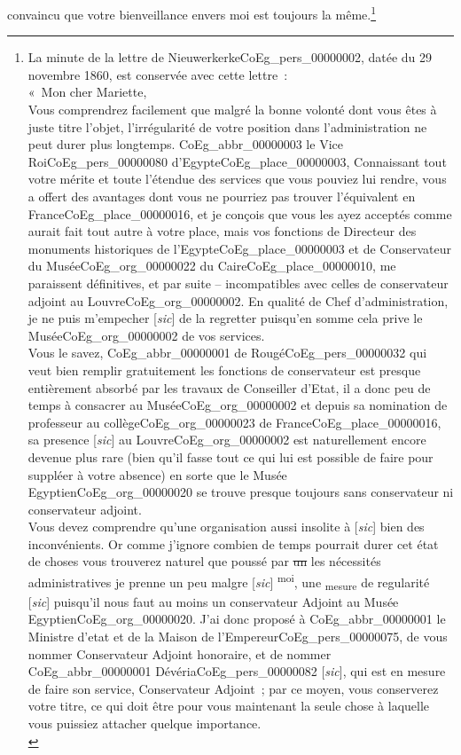 \documentclass{book}
\begin{document}
convaincu que votre bienveillance envers moi est toujours la même.\footnote{La minute de la lettre de Nieuwerkerke\gls{CoEg_pers_00000002}, datée du 29 novembre 1860, est conservée avec cette lettre~:\\
\indent «~Mon cher Mariette,\\
\indent Vous comprendrez facilement que malgré la bonne volonté dont vous êtes à juste titre l’objet, l’irrégularité de votre position dans l’administration ne peut durer plus longtemps. \gls{CoEg_abbr_00000003} le Vice Roi\gls{CoEg_pers_00000080} d’Egypte\gls{CoEg_place_00000003}, Connaissant tout votre mérite et toute l’étendue des services que vous pouviez lui rendre, vous a offert des avantages dont vous ne pourriez pas trouver l’équivalent en France\gls{CoEg_place_00000016}, et je conçois que vous les ayez acceptés comme aurait fait tout autre à votre place, mais vos fonctions de Directeur des monuments historiques de l’Egypte\gls{CoEg_place_00000003} et de Conservateur du Musée\gls{CoEg_org_00000022} du Caire\gls{CoEg_place_00000010}, me paraissent définitives, et par suite – incompatibles avec celles de conservateur adjoint au Louvre\gls{CoEg_org_00000002}. En qualité de Chef d’administration, je ne puis m’empecher [\textit{sic}] de la regretter puisqu’en somme cela prive le Musée\gls{CoEg_org_00000002} de vos services.\\
\indent Vous le savez, \gls{CoEg_abbr_00000001} de Rougé\gls{CoEg_pers_00000032} qui veut bien remplir gratuitement les fonctions de conservateur est presque entièrement absorbé par les travaux de Conseiller d’Etat, il a donc peu de temps à consacrer au Musée\gls{CoEg_org_00000002} et depuis sa nomination de professeur au collège\gls{CoEg_org_00000023} de France\gls{CoEg_place_00000016}, sa presence [\textit{sic}] au Louvre\gls{CoEg_org_00000002} est naturellement encore devenue plus rare (bien qu’il fasse tout ce qui lui est possible de faire pour suppléer à votre absence) en sorte que le Musée Egyptien\gls{CoEg_org_00000020} se trouve presque toujours sans conservateur ni conservateur adjoint.\\
\indent Vous devez comprendre qu’une organisation aussi insolite à {[\textit{sic}]} bien des inconvénients. Or comme j’ignore combien de temps pourrait durer cet état de choses vous trouverez naturel que poussé par \sout{un} les nécessités administratives je prenne un peu malgre [\textit{sic}] \textsuperscript{moi}, une \textsubscript{mesure} de regularité [\textit{sic}] puisqu’il nous faut au moins un conservateur Adjoint au Musée Egyptien\gls{CoEg_org_00000020}. J’ai donc proposé à \gls{CoEg_abbr_00000001} le Ministre d’etat et de la Maison de l’Empereur\gls{CoEg_pers_00000075}, de vous nommer Conservateur Adjoint honoraire, et de nommer \gls{CoEg_abbr_00000001} Dévéria\gls{CoEg_pers_00000082} {[\textit{sic}]}, qui est en mesure de faire son service, Conservateur Adjoint~; par ce moyen, vous conserverez votre titre, ce qui doit être pour vous maintenant la seule chose à laquelle vous puissiez attacher quelque importance.\\
}
\end{document}
